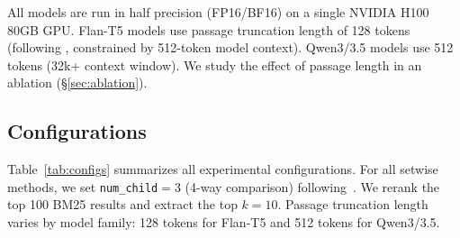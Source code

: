 All models are run in half precision (FP16/BF16) on a single NVIDIA H100 80GB GPU. Flan-T5 models use passage truncation length of 128 tokens (following \citet{zhuang2024setwise}, constrained by 512-token model context). Qwen3/3.5 models use 512 tokens (32k+ context window). We study the effect of passage length in an ablation (\S\ref{sec:ablation}).

\subsection{Configurations}

Table~\ref{tab:configs} summarizes all experimental configurations. For all setwise methods, we set \texttt{num\_child}$=3$ (4-way comparison) following~\citet{zhuang2024setwise}. We rerank the top 100 BM25 results and extract the top $k=10$. Passage truncation length varies by model family: 128 tokens for Flan-T5 and 512 tokens for Qwen3/3.5.

\begin{table}[!htbp]
\caption{Experimental configurations. All use $k{=}10$, hits${}={100}$, $c{=}3$.}
\label{tab:configs}
\small
{}
\end{table}

